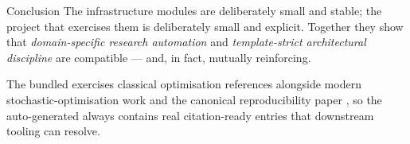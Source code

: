 \documentclass[
  ignorenonframetext,
]{beamer}
\begin{document}
\begin{frame}{Conclusion}
The infrastructure modules are deliberately small and stable; the
project that exercises them is deliberately small and explicit. Together
they show that \emph{domain-specific research automation} and
\emph{template-strict architectural discipline} are compatible --- and,
in fact, mutually reinforcing.

The bundled  exercises classical optimisation
references  alongside modern stochastic-optimisation work
 and the canonical
reproducibility paper , so the auto-generated
 always contains real citation-ready
entries that downstream tooling can resolve.
\end{frame}
\end{document}
